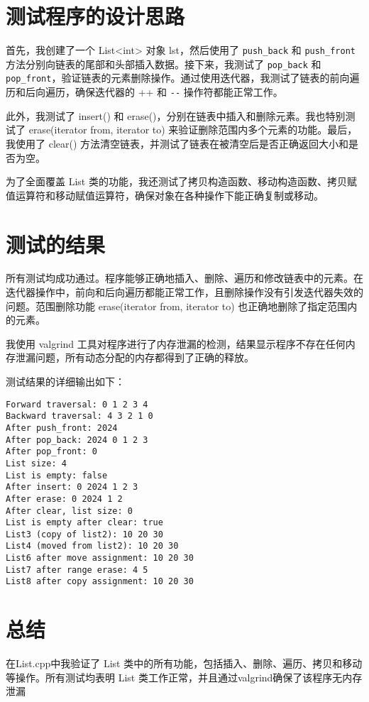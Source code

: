 \documentclass[UTF8]{ctexart}
\begin{document}
\pagestyle{fancy}
\fancyhead{}

\section{测试程序的设计思路}

首先，我创建了一个 List<int> 对象 lst，然后使用了 \verb|push_back| 和 \verb|push_front| 方法分别向链表的尾部和头部插入数据。接下来，我测试了 \verb|pop_back| 和 \verb|pop_front|，验证链表的元素删除操作。通过使用迭代器，我测试了链表的前向遍历和后向遍历，确保迭代器的 ++ 和 \verb|--| 操作符都能正常工作。

此外，我测试了 insert() 和 erase()，分别在链表中插入和删除元素。我也特别测试了 erase(iterator from, iterator to) 来验证删除范围内多个元素的功能。最后，我使用了 clear() 方法清空链表，并测试了链表在被清空后是否正确返回大小和是否为空。

为了全面覆盖 List 类的功能，我还测试了拷贝构造函数、移动构造函数、拷贝赋值运算符和移动赋值运算符，确保对象在各种操作下能正确复制或移动。

\section{测试的结果}

所有测试均成功通过。程序能够正确地插入、删除、遍历和修改链表中的元素。在迭代器操作中，前向和后向遍历都能正常工作，且删除操作没有引发迭代器失效的问题。范围删除功能 erase(iterator from, iterator to) 也正确地删除了指定范围内的元素。

我使用 valgrind 工具对程序进行了内存泄漏的检测，结果显示程序不存在任何内存泄漏问题，所有动态分配的内存都得到了正确的释放。

测试结果的详细输出如下：
\begin{verbatim}
Forward traversal: 0 1 2 3 4 
Backward traversal: 4 3 2 1 0 
After push_front: 2024
After pop_back: 2024 0 1 2 3 
After pop_front: 0
List size: 4
List is empty: false
After insert: 0 2024 1 2 3 
After erase: 0 2024 1 2 
After clear, list size: 0
List is empty after clear: true
List3 (copy of list2): 10 20 30 
List4 (moved from list2): 10 20 30 
List6 after move assignment: 10 20 30 
List7 after range erase: 4 5 
List8 after copy assignment: 10 20 30 
\end{verbatim}


\section{总结}

在List.cpp中我验证了 List 类中的所有功能，包括插入、删除、遍历、拷贝和移动等操作。所有测试均表明 List 类工作正常，并且通过valgrind确保了该程序无内存泄漏
\end{document}
